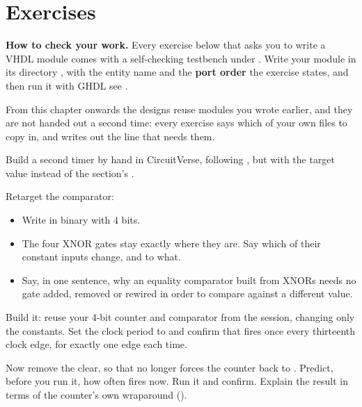 
\section{Exercises}
\label{c7:sec:exercises}

\begin{aside}
\textbf{How to check your work.} Every exercise below that asks you to write a VHDL module comes
with a self-checking testbench under . Write your module in its
directory , with the entity name and the \textbf{port order} the exercise
states, and then run it with GHDL \textemdash{} see .

From this chapter onwards the designs reuse modules you wrote earlier, and they are not handed out a
second time: every exercise says which of your own files to copy in, and writes out the
 line that needs them.
\end{aside}


\label{c7:ex:byhand}
Build a second timer by hand in CircuitVerse, following , but with the target
value  instead of the section's .

 Retarget the comparator:
\begin{itemize}
  \item Write  in binary with 4 bits.
  \item The four XNOR gates stay exactly where they are. Say which of their constant inputs change,
    and to what.
  \item Say, in one sentence, why an equality comparator built from XNORs needs no gate added,
    removed or rewired in order to compare against a different value.
\end{itemize}

 Build it: reuse your 4-bit counter and comparator from the session, changing only the
constants. Set the clock period to  and confirm that  fires once every
thirteenth clock edge, for exactly one edge each time.

 Now remove the clear, so that  no longer forces the counter back to
. Predict, before you run it, how often  fires now. Run it and confirm.
Explain the result in terms of the counter's own wraparound ().


